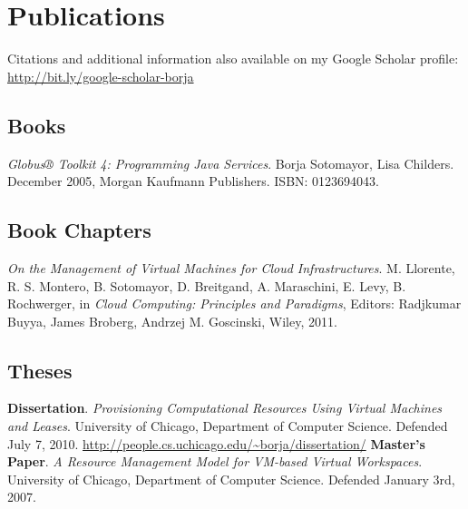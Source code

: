 \documentclass{resume}
\begin{document}
\pagebreak

\section*{\hspace{-1cm}Publications}

Citations and additional information also available on my Google Scholar profile:\\ \url{http://bit.ly/google-scholar-borja}

\subsection*{Books}
\begin{category}{}
\citembullet \emph{Globus® Toolkit 4: Programming Java Services}. Borja Sotomayor, Lisa Childers. December 2005, Morgan Kaufmann Publishers. ISBN: 0123694043.
\end{category}

\subsection*{Book Chapters}
\begin{category}{}
\citembullet \emph{On the Management of Virtual Machines for Cloud Infrastructures}. M. Llorente, R. S. Montero, B. Sotomayor, D. Breitgand, A. Maraschini, E. Levy, B. Rochwerger, in \emph{Cloud Computing: Principles and Paradigms}, Editors: Radjkumar Buyya, James Broberg, Andrzej M. Goscinski, Wiley, 2011.
\end{category}

\subsection*{Theses}
\begin{category}{}
\citembullet \textbf{Dissertation}. \emph{Provisioning Computational Resources Using Virtual Machines and Leases}. University of Chicago, Department of Computer Science. Defended July 7, 2010. \url{http://people.cs.uchicago.edu/~borja/dissertation/}
\citembullet \textbf{Master's Paper}. \emph{A Resource Management Model for VM-based Virtual Workspaces}. University of Chicago, Department of Computer Science. Defended January 3rd, 2007.
\end{category}
\end{document}
